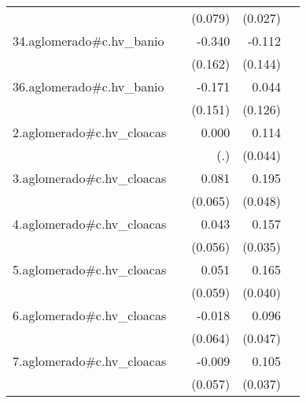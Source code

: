 {\begin{longtable}{l*{4}{D{.}{.}{-1}}}
            &                     &     (0.079)         &     (0.027)         &                     \\
\addlinespace
34.aglomerado#c.hv\_banio&                     &      -0.340\sym{*}  &      -0.112         &                     \\
            &                     &     (0.162)         &     (0.144)         &                     \\
\addlinespace
36.aglomerado#c.hv\_banio&                     &      -0.171         &       0.044         &                     \\
            &                     &     (0.151)         &     (0.126)         &                     \\
\addlinespace
2.aglomerado#c.hv\_cloacas&                     &       0.000         &       0.114\sym{**} &                     \\
            &                     &         (.)         &     (0.044)         &                     \\
\addlinespace
3.aglomerado#c.hv\_cloacas&                     &       0.081         &       0.195\sym{***}&                     \\
            &                     &     (0.065)         &     (0.048)         &                     \\
\addlinespace
4.aglomerado#c.hv\_cloacas&                     &       0.043         &       0.157\sym{***}&                     \\
            &                     &     (0.056)         &     (0.035)         &                     \\
\addlinespace
5.aglomerado#c.hv\_cloacas&                     &       0.051         &       0.165\sym{***}&                     \\
            &                     &     (0.059)         &     (0.040)         &                     \\
\addlinespace
6.aglomerado#c.hv\_cloacas&                     &      -0.018         &       0.096\sym{*}  &                     \\
            &                     &     (0.064)         &     (0.047)         &                     \\
\addlinespace
7.aglomerado#c.hv\_cloacas&                     &      -0.009         &       0.105\sym{**} &                     \\
            &                     &     (0.057)         &     (0.037)         &                     \\

\end{longtable}}
